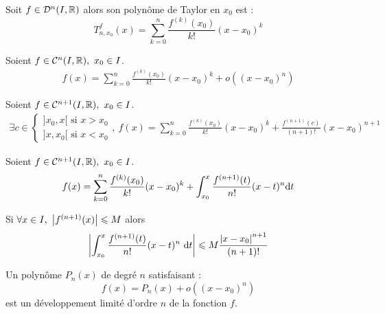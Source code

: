 \begin{definition}
    Soit $f \in \mathcal{D}^n(I, \mathbb{R})$ alors son polynôme de Taylor en $x_0$ est :
    \[ T_{n, x_0}^f(x) = \sum_{k = 0}^{n} \frac{f^{(k)}(x_0)}{k!} (x - x_0)^k \]
\end{definition}

\begin{theorem}
    Soient $f \in \mathcal{C}^{n}(I, \mathbb{R}),\ x_0 \in I$.
    \begin{align*}
        f(x) = \sum_{k = 0}^{n} \frac{f^{(k)}(x_0)}{k!} (x - x_0)^k + o((x - x_0)^n) 
    \end{align*}
\end{theorem}

\begin{theorem}
    Soient $f \in \mathcal{C}^{n+1}(I, \R),\ x_0 \in I$. 
    \begin{align*}
        \exists c \in 
        \begin{cases}
            ]x_0, x[ \text{ si } x > x_0 \\
            ]x, x_0[ \text{ si } x < x_0
        \end{cases},\
        f(x) = \sum_{k = 0}^{n} \frac{f^{(k)}(x_0)}{k!} (x - x_0)^k + 
        \frac{f^{(n+1)}(c)}{(n+1)!} (x - x_0)^{n+1}
    \end{align*}
\end{theorem}

\begin{theorem}
    Soient $f \in \mathcal{C}^{n+1}(I, \R),\ x_0 \in I$.
    \begin{align*}
        f(x) = \sum_{k = 0}^{n} \frac{f^{(k)}(x_0)}{k!} (x - x_0)^k + \int_{x_0}^{x} \frac{f^{(n+1)}(t)}{n!} (x - t)^n \diffd t
    \end{align*}
\end{theorem}

\begin{corollary}
    Si $\forall x \in I,\ \abs{f^{(n+1)}(x)} \leqslant M$ alors
    \[ \abs{\int_{x_0}^{x} \frac{f^{(n+1)}(t)}{n!} (x - t)^n \ \diffd t} \leq M \frac{\abs{x - x_0}^{n+1}}{(n+1)!} \]
\end{corollary}

\begin{definition}
    Un polynôme $P_n(x)$ de degré $n$ satisfaisant :
    \[ f(x) = P_n(x) + o((x - x_0)^n) \]
    est un développement limité d'ordre $n$ de la fonction $f$.
\end{definition}

